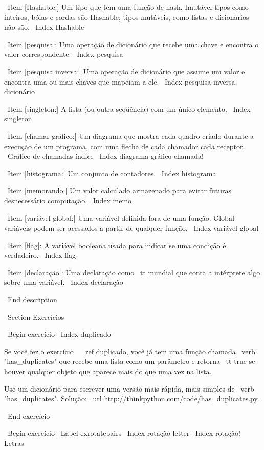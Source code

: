 \documentclass[10pt]{book}
\begin{document}
\begin {itemize}
{{{{{{{\ Item [Hashable:] Um tipo que tem uma função de hash. Imutável
tipos como inteiros,
bóias e cordas são Hashable; tipos mutáveis, como listas e
dicionários não são.
\ Index {} Hashable

\ Item [pesquisa]: Uma operação de dicionário que recebe uma chave e encontra
o valor correspondente.
\ Index {pesquisa}

\ Item [pesquisa inversa:] Uma operação de dicionário que assume um valor e encontra
uma ou mais chaves que mapeiam a ele.
\ Index {pesquisa inversa, dicionário}

\ Item [singleton:] A lista (ou outra seqüência) com um único elemento.
\ Index {singleton}

\ Item [chamar gráfico:] Um diagrama que mostra cada quadro criado durante
a execução de um programa, com uma flecha de cada chamador
cada receptor. 
\ {Gráfico de chamadas} índice
\ Index {diagrama gráfico chamada!}

\ Item [histograma:] Um conjunto de contadores.
\ Index {} histograma

\ Item [memorando:] Um valor calculado armazenado para evitar futuras desnecessário 
computação.
\ Index {memo}

\ Item [variável global:] Uma variável definida fora de uma função. Global
variáveis ​​podem ser acessados ​​a partir de qualquer função.
\ Index {variável global}

\ Item [flag]: A variável booleana usada para indicar se uma condição
é verdadeiro.
\ Index {flag}

\ Item [declaração]: Uma declaração como {\ tt mundial} que conta a
intérprete algo sobre uma variável.
\ Index {declaração}

\ End {description}

\ Section {Exercícios}

\ Begin {} exercício
\ Index {} duplicado

Se você fez o exercício ~ \ ref {} duplicado, você já tem
uma função chamada \ verb "has_duplicates" que recebe uma lista
como um parâmetro e retorna {\ tt true} se houver qualquer objeto
que aparece mais do que uma vez na lista.

Use um dicionário para escrever uma versão mais rápida, mais simples de
\ verb "has_duplicates". 
Solução: \ url {http://thinkpython.com/code/has_duplicates.py}.

\ End {} exercício


\ Begin {} exercício
\ Label {} exrotatepairs
\ Index {rotação letter}
\ Index {rotação! Letras}

}}}}}}}
\end{itemize}
\end{document}
